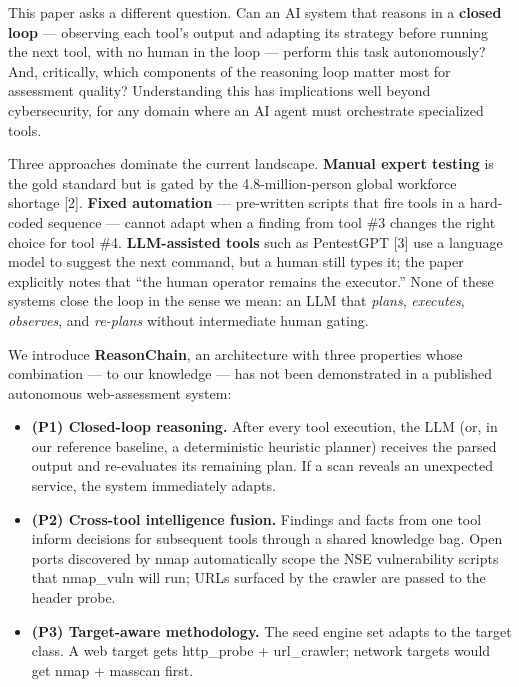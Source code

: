 \documentclass[
]{article}
\begin{document}
This paper asks a different question. Can an AI system that reasons in a
\textbf{closed loop} --- observing each tool's output and adapting its
strategy before running the next tool, with no human in the loop ---
perform this task autonomously? And, critically, which components of the
reasoning loop matter most for assessment quality? Understanding this
has implications well beyond cybersecurity, for any domain where an AI
agent must orchestrate specialized tools.

Three approaches dominate the current landscape. \textbf{Manual expert
testing} is the gold standard but is gated by the 4.8-million-person
global workforce shortage {[}2{]}. \textbf{Fixed automation} ---
pre-written scripts that fire tools in a hard-coded sequence --- cannot
adapt when a finding from tool \#3 changes the right choice for tool
\#4. \textbf{LLM-assisted tools} such as PentestGPT {[}3{]} use a
language model to suggest the next command, but a human still types it;
the paper explicitly notes that ``the human operator remains the
executor.'' None of these systems close the loop in the sense we mean:
an LLM that \emph{plans}, \emph{executes}, \emph{observes}, and
\emph{re-plans} without intermediate human gating.

We introduce \textbf{ReasonChain}, an architecture with three properties
whose combination --- to our knowledge --- has not been demonstrated in
a published autonomous web-assessment system:

\begin{itemize}
\item
  \textbf{(P1) Closed-loop reasoning.} After every tool execution, the
  LLM (or, in our reference baseline, a deterministic heuristic planner)
  receives the parsed output and re-evaluates its remaining plan. If a
  scan reveals an unexpected service, the system immediately adapts.
\item
  \textbf{(P2) Cross-tool intelligence fusion.} Findings and facts from
  one tool inform decisions for subsequent tools through a shared
  knowledge bag. Open ports discovered by nmap automatically scope the
  NSE vulnerability scripts that nmap\_vuln will run; URLs surfaced by
  the crawler are passed to the header probe.
\item
  \textbf{(P3) Target-aware methodology.} The seed engine set adapts to
  the target class. A web target gets http\_probe + url\_crawler;
  network targets would get nmap + masscan first.
\end{itemize}
\end{document}
